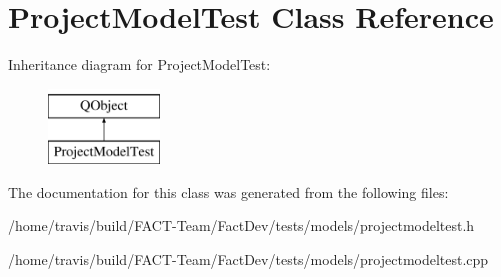 \hypertarget{classProjectModelTest}{\section{Project\-Model\-Test Class Reference}
\label{classProjectModelTest}
}
Inheritance diagram for Project\-Model\-Test\-:\begin{figure}[H]
\begin{center}
\leavevmode
\includegraphics[height=2.000000cm]{dd/d54/classProjectModelTest}
\end{center}
\end{figure}


The documentation for this class was generated from the following files\-:\begin{DoxyCompactItemize}
\item 
/home/travis/build/\-F\-A\-C\-T-\/\-Team/\-Fact\-Dev/tests/models/projectmodeltest.\-h\item 
/home/travis/build/\-F\-A\-C\-T-\/\-Team/\-Fact\-Dev/tests/models/projectmodeltest.\-cpp\end{DoxyCompactItemize}
